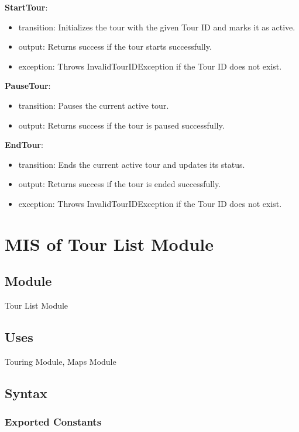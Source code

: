 \documentclass[12pt, titlepage]{article}
\begin{document}
\noindent \textbf{StartTour}:
\begin{itemize}
    \item transition: Initializes the tour with the given Tour ID and marks it as active.
    \item output: Returns success if the tour starts successfully.
    \item exception: Throws InvalidTourIDException if the Tour ID does not exist.
\end{itemize}

\noindent \textbf{PauseTour}:
\begin{itemize}
    \item transition: Pauses the current active tour.
    \item output: Returns success if the tour is paused successfully.
\end{itemize}

\noindent \textbf{EndTour}:
\begin{itemize}
    \item transition: Ends the current active tour and updates its status.
    \item output: Returns success if the tour is ended successfully.
    \item exception: Throws InvalidTourIDException if the Tour ID does not exist.
\end{itemize}

\newpage

\section{MIS of Tour List Module} \label{TourListModule}

\subsection{Module}

Tour List Module

\subsection{Uses}

Touring Module, Maps Module

\subsection{Syntax}

\subsubsection{Exported Constants}
\end{document}
